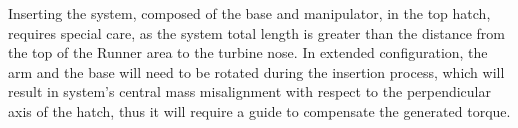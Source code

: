Inserting the system, composed of the base and manipulator, in the top
hatch, requires special care, as the system total length is greater
than the distance from the top of the Runner area to the turbine nose. In
extended configuration, the arm and the base will need to be rotated during the
insertion process, which will result in system's central mass misalignment with respect to the
perpendicular axis of the hatch, thus it will require a guide to compensate
the generated torque.






